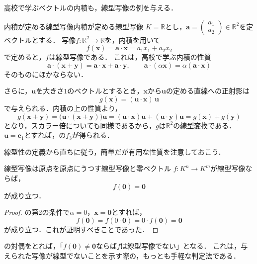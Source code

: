 高校で学ぶベクトルの内積も，線型写像の例を与える．

\begin{example}{内積が定める線型写像}{内積が定める線型写像}
  $K = \mathbb{R}$とし，$\bm{a} = \begin{pmatrix} a_1 \\ a_2 \end{pmatrix} \in \mathbb{R}^2$を定ベクトルとする．
  写像$f \colon \mathbb{R}^2 \to \mathbb{R}$を，内積を用いて
  \[
    f(\bm{x}) = \bm{a} \cdot \bm{x} = a_1 x_1 + a_2 x_2
  \]
  で定めると，$f$は線型写像である．
  これは，高校で学ぶ内積の性質
  \[
    \bm{a} \cdot (\bm{x} + \bm{y}) = \bm{a} \cdot \bm{x} + \bm{a} \cdot \bm{y}, \qquad
    \bm{a} \cdot (\alpha\bm{x}) = \alpha (\bm{a} \cdot \bm{x})
  \]
  そのものにほかならない．

  さらに，$\bm{u}$を大きさ$1$のベクトルとするとき，$\bm{x}$から$\bm{u}$の定める直線への正射影は
  \[
    g(\bm{x}) = (\bm{u} \cdot \bm{x})\,\bm{u}
  \]
  で与えられる．内積の上の性質より，
  \[
    g(\bm{x} + \bm{y}) = \bigl(\bm{u} \cdot (\bm{x} + \bm{y})\bigr)\bm{u}
    = (\bm{u} \cdot \bm{x})\bm{u} + (\bm{u} \cdot \bm{y})\bm{u} = g(\bm{x}) + g(\bm{y})
  \]
  となり，スカラー倍についても同様であるから，$g$は$\mathbb{R}^2$の線型変換である．
  $\bm{u} = \bm{e}_1$とすれば，の$f_3$が得られる．
\end{example}

線型性の定義から直ちに従う，簡単だが有用な性質を注意しておこう．

\begin{prop}{線型写像は原点を原点にうつす}{線型写像と零ベクトル}
  $f \colon K^n \to K^m$が線型写像ならば，
  \[
    f(\bm{0}) = \bm{0}
  \]
  が成り立つ．
\end{prop}

\begin{leftbar}
\begin{proof}
  の第$2$の条件で$\alpha = 0$，$\bm{x} = \bm{0}$とすれば，
  \[
    f(\bm{0}) = f(0 \cdot \bm{0}) = 0 \cdot f(\bm{0}) = \bm{0}
  \]
  が成り立つ．これが証明すべきことであった．
\end{proof}
\end{leftbar}

の対偶をとれば，「$f(\bm{0}) \ne \bm{0}$ならば$f$は線型写像でない」となる．
これは，与えられた写像が線型でないことを示す際の，もっとも手軽な判定法である．

